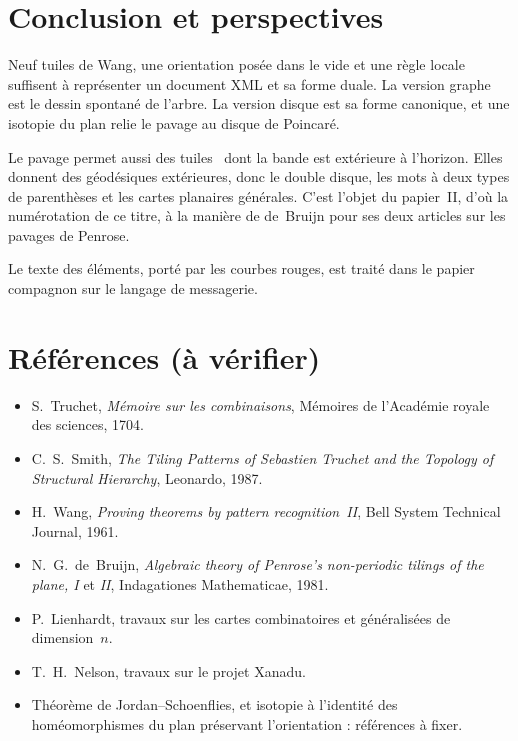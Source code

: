 \documentclass[11pt,a4paper]{article}
\theoremstyle{remark}
\begin{document}
\section{Conclusion et perspectives}

Neuf tuiles de Wang, une orientation posée dans le vide et une règle locale
suffisent à représenter un document XML et sa forme duale. La version graphe est
le dessin spontané de l'arbre. La version disque est sa forme canonique, et une
isotopie du plan relie le pavage au disque de Poincaré.

Le pavage permet aussi des tuiles \CONNECT\ dont la bande est extérieure à
l'horizon. Elles donnent des géodésiques extérieures, donc le double disque, les
mots à deux types de parenthèses et les cartes planaires générales. C'est l'objet
du papier~II, d'où la numérotation de ce titre, à la manière de de~Bruijn pour
ses deux articles sur les pavages de Penrose.

Le texte des éléments, porté par les courbes rouges, est traité dans le papier
compagnon sur le langage de messagerie.

\section*{Références (à vérifier)}
\begingroup\sloppy

\begin{itemize}[leftmargin=*]
  \item S.~Truchet, \emph{Mémoire sur les combinaisons}, Mémoires de l'Académie
    royale des sciences, 1704.
  \item C.~S.~Smith, \emph{The Tiling Patterns of Sebastien Truchet and the
    Topology of Structural Hierarchy}, Leonardo, 1987.
  \item H.~Wang, \emph{Proving theorems by pattern recognition~II}, Bell System
    Technical Journal, 1961.
  \item N.~G.~de~Bruijn, \emph{Algebraic theory of Penrose's non-periodic
    tilings of the plane, I} et \emph{II}, Indagationes Mathematicae, 1981.
  \item P.~Lienhardt, travaux sur les cartes combinatoires et généralisées de
    dimension~$n$.
  \item T.~H.~Nelson, travaux sur le projet Xanadu.
  \item Théorème de Jordan--Schoenflies, et isotopie à l'identité des
    homéomorphismes du plan préservant l'orientation : références à fixer.
\end{itemize}
\endgroup
\end{document}
